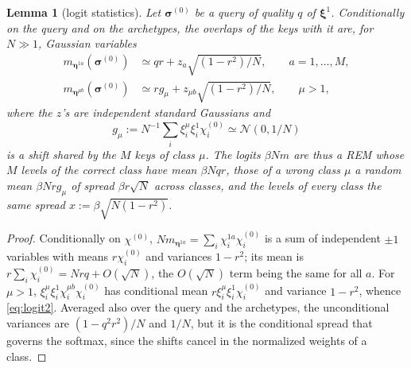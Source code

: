 \documentclass[11pt,a4paper]{article}
\newtheorem{lemma}{Lemma}
\newcommand{\s}{\bm{\sigma}}
\newcommand{\x}{\bm{\xi}}
\newcommand{\e}{\bm{\eta}}
\begin{document}
\begin{lemma}[logit statistics]\label{lem:logits}
Let $\s^{(0)}$ be a query of quality $q$ of $\x^1$. Conditionally on the query and on the archetypes, the overlaps of the keys with it are, for $N\gg1$, Gaussian variables
\begin{align}
m_{\e^{1a}}(\s^{(0)})&\simeq qr+z_a\sqrt{(1-r^2)/N},\qquad a=1,\dots,M,\label{eq:logit1}\\
m_{\e^{\mu b}}(\s^{(0)})&\simeq rg_\mu+z_{\mu b}\sqrt{(1-r^2)/N},\qquad \mu>1,\label{eq:logit2}
\end{align}
where the $z$'s are independent standard Gaussians and
\begin{equation*}
g_\mu:=N^{-1}\sum_i\xi^\mu_i\xi^1_i\chi^{(0)}_i\simeq\mathcal N(0,1/N)
\end{equation*}
is a shift shared by the $M$ keys of class $\mu$. The logits $\beta Nm$ are thus a REM whose $M$ levels of the correct class have mean $\beta Nqr$, those of a wrong class $\mu$ a random mean $\beta Nrg_\mu$ of spread $\beta r\sqrt N$ across classes, and the levels of every class the same spread $x:=\beta\sqrt{N(1-r^2)}$.
\end{lemma}
\begin{proof}
Conditionally on $\chi^{(0)}$, $Nm_{\e^{1a}}=\sum_i\chi^{1a}_i\chi^{(0)}_i$ is a sum of independent $\pm1$ variables with means $r\chi^{(0)}_i$ and variances $1-r^2$; its mean is $r\sum_i\chi^{(0)}_i=Nrq+O(\sqrt N)$, the $O(\sqrt N)$ term being the same for all $a$. For $\mu>1$, $\xi^\mu_i\xi^1_i\chi^{\mu b}_i\chi^{(0)}_i$ has conditional mean $r\xi^\mu_i\xi^1_i\chi^{(0)}_i$ and variance $1-r^2$, whence \eqref{eq:logit2}. Averaged also over the query and the archetypes, the unconditional variances are $(1-q^2r^2)/N$ and $1/N$, but it is the conditional spread that governs the softmax, since the shifts cancel in the normalized weights of a class.
\end{proof}
\end{document}
